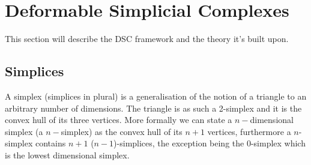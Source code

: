 \section{Deformable Simplicial Complexes}
\label{sec:dsc}

This section will describe the DSC framework and the theory it's built upon.

\subsection{Simplices}

A simplex (simplices in plural) is a generalisation of the notion of a triangle
to an arbitrary number of dimensions. The triangle is as such a 2-simplex and it
is the convex hull of its three vertices. More formally we can state a
$n-$dimensional simplex (a $n-$simplex) as the convex hull of its $n+1$
vertices, furthermore a $n$-simplex contains $n+1$ ($n-1$)-simplices, the
exception being the 0-simplex which is the lowest dimensional simplex.

